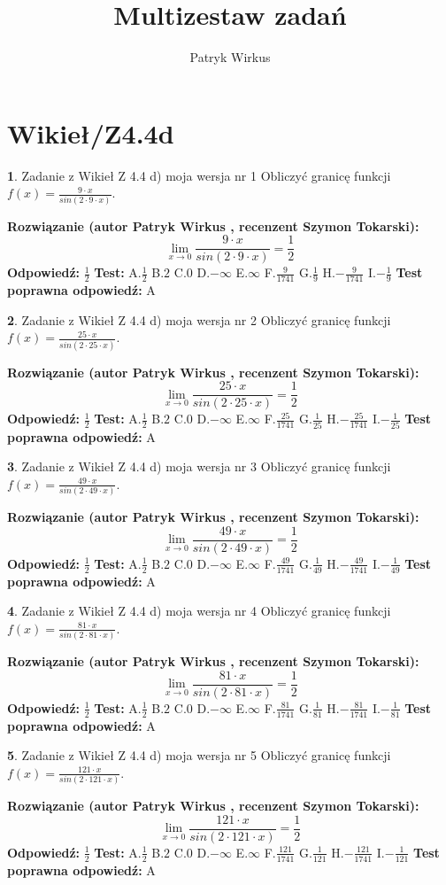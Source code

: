 \documentclass[12pt, a4paper]{article}
\title{Multizestaw zadań}
\author{Patryk Wirkus}
\date{}
\theoremstyle{definition} %
\newtheorem{zad}{}
\newcommand{\kategoria}[1]{\section{#1}}
\newcommand{\zadStart}[1]{\begin{zad}#1\newline}
\newcommand{\zadStop}{\end{zad}}
\newcommand{\rozwStart}[2]{\noindent \textbf{Rozwiązanie (autor #1 , recenzent #2): }\newline}
\newcommand{\rozwStop}{\newline}
\newcommand{\odpStart}{\noindent \textbf{Odpowiedź:}\newline}
\newcommand{\odpStop}{\newline}
\newcommand{\testStart}{\noindent \textbf{Test:}\newline}
\newcommand{\testStop}{\newline}
\newcommand{\kluczStart}{\noindent \textbf{Test poprawna odpowiedź:}\newline}
\newcommand{\kluczStop}{\newline}
\begin{document}
\maketitle

\kategoria{Wikieł/Z4.4d}


\zadStart{Zadanie z Wikieł Z 4.4 d) moja wersja nr 1}
Obliczyć granicę funkcji $f(x)=\frac{9\cdot x}{sin(2 \cdot9\cdot x)}$.
\zadStop
\rozwStart{Patryk Wirkus}{Szymon Tokarski}
$$\lim\limits_{x\to 0}\frac{9\cdot x}{sin(2 \cdot9\cdot x)}=\frac{1}{2}$$
\rozwStop
\odpStart
$\frac{1}{2}$
\odpStop
\testStart
A.$\frac{1}{2}$
B.$2$
C.$0$
D.$-\infty$
E.$\infty$
F.$\frac{9}{1741}$
G.$\frac{1}{9}$
H.$-\frac{9}{1741}$
I.$-\frac{1}{9}$
\testStop
\kluczStart
A
\kluczStop



\zadStart{Zadanie z Wikieł Z 4.4 d) moja wersja nr 2}
Obliczyć granicę funkcji $f(x)=\frac{25\cdot x}{sin(2 \cdot25\cdot x)}$.
\zadStop
\rozwStart{Patryk Wirkus}{Szymon Tokarski}
$$\lim\limits_{x\to 0}\frac{25\cdot x}{sin(2 \cdot25\cdot x)}=\frac{1}{2}$$
\rozwStop
\odpStart
$\frac{1}{2}$
\odpStop
\testStart
A.$\frac{1}{2}$
B.$2$
C.$0$
D.$-\infty$
E.$\infty$
F.$\frac{25}{1741}$
G.$\frac{1}{25}$
H.$-\frac{25}{1741}$
I.$-\frac{1}{25}$
\testStop
\kluczStart
A
\kluczStop



\zadStart{Zadanie z Wikieł Z 4.4 d) moja wersja nr 3}
Obliczyć granicę funkcji $f(x)=\frac{49\cdot x}{sin(2 \cdot49\cdot x)}$.
\zadStop
\rozwStart{Patryk Wirkus}{Szymon Tokarski}
$$\lim\limits_{x\to 0}\frac{49\cdot x}{sin(2 \cdot49\cdot x)}=\frac{1}{2}$$
\rozwStop
\odpStart
$\frac{1}{2}$
\odpStop
\testStart
A.$\frac{1}{2}$
B.$2$
C.$0$
D.$-\infty$
E.$\infty$
F.$\frac{49}{1741}$
G.$\frac{1}{49}$
H.$-\frac{49}{1741}$
I.$-\frac{1}{49}$
\testStop
\kluczStart
A
\kluczStop



\zadStart{Zadanie z Wikieł Z 4.4 d) moja wersja nr 4}
Obliczyć granicę funkcji $f(x)=\frac{81\cdot x}{sin(2 \cdot81\cdot x)}$.
\zadStop
\rozwStart{Patryk Wirkus}{Szymon Tokarski}
$$\lim\limits_{x\to 0}\frac{81\cdot x}{sin(2 \cdot81\cdot x)}=\frac{1}{2}$$
\rozwStop
\odpStart
$\frac{1}{2}$
\odpStop
\testStart
A.$\frac{1}{2}$
B.$2$
C.$0$
D.$-\infty$
E.$\infty$
F.$\frac{81}{1741}$
G.$\frac{1}{81}$
H.$-\frac{81}{1741}$
I.$-\frac{1}{81}$
\testStop
\kluczStart
A
\kluczStop



\zadStart{Zadanie z Wikieł Z 4.4 d) moja wersja nr 5}
Obliczyć granicę funkcji $f(x)=\frac{121\cdot x}{sin(2 \cdot121\cdot x)}$.
\zadStop
\rozwStart{Patryk Wirkus}{Szymon Tokarski}
$$\lim\limits_{x\to 0}\frac{121\cdot x}{sin(2 \cdot121\cdot x)}=\frac{1}{2}$$
\rozwStop
\odpStart
$\frac{1}{2}$
\odpStop
\testStart
A.$\frac{1}{2}$
B.$2$
C.$0$
D.$-\infty$
E.$\infty$
F.$\frac{121}{1741}$
G.$\frac{1}{121}$
H.$-\frac{121}{1741}$
I.$-\frac{1}{121}$
\testStop
\kluczStart
A
\kluczStop
\end{document}
